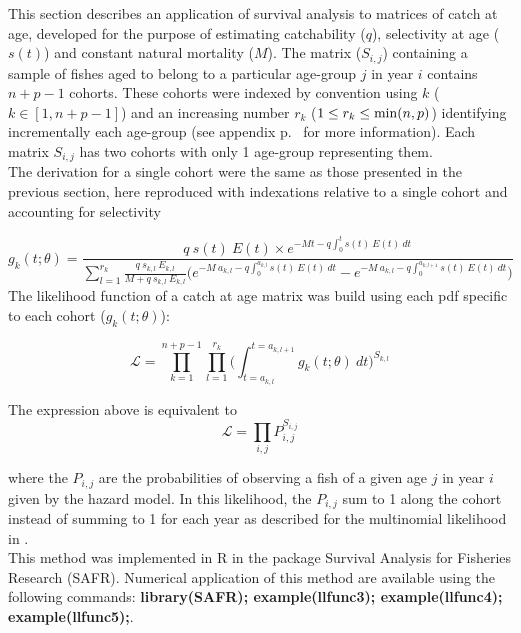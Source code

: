 This section describes an application of survival analysis to matrices of catch at age, developed for the purpose of estimating catchability ($q$), selectivity at age ($s(t)$) and constant natural mortality ($M$). The matrix ($S_{i,j}$) containing a sample of fishes aged to belong to a particular age-group $j$ in year $i$ contains $n+p-1$ cohorts. These cohorts were indexed by convention using $k$ ($k \in [1, n+p-1]$) and an increasing number $r_{k}$ ($ 1 \leq r_{k} \leq {\rm min}(n,p)$) identifying incrementally each age-group (see appendix p.~\pageref{Appendix:DefinitionsOfMathematicalSymbols} for more information). Each matrix $S_{i,j}$ has two cohorts with only 1 age-group representing them.\\

The derivation for a single cohort were the same as those presented in the previous section, here reproduced with indexations relative to a single cohort and accounting for selectivity

\begin{equation}
g_{k}(t; \theta) = \frac{q \ s(t) \ E(t) \times e^{-Mt-q\int_{0}^{t} s(t) \ E(t) \ dt}}{\sum_{l=1}^{r_{k}} \frac{q \ s_{k,l} \ E_{k,l}}{M+q \ s_{k,l} \ E_{k,l}} \bigl ( e^{-M \ a_{k,l}-q\int_{0}^{a_{k,l}}s(t) \ E(t) \ dt} - e^{-M \ a_{k,l}-q\int_{0}^{a_{k,l+1}}s(t) \ E(t) \ dt} \bigr )} 
\end{equation}
\newline
The likelihood function of a catch at age matrix was build using each pdf specific to each cohort ($g_{k}(t; \theta)$):

\begin{equation}
\mathcal{L} = \prod_{k=1}^{n+p-1} \prod_{l=1}^{r_{k}}  \bigl ( \int_{t=a_{k,l}}^{t=a_{k,l+1}} g_{k}(t; \theta) \ dt \bigr ) ^ {S_{k,l}}
\end{equation}

The expression above is equivalent to 
\begin{equation}
\mathcal{L} = \prod_{i,j} P_{i,j} ^ {S_{i,j}}
\end{equation}

\noindent where the $P_{i,j}$ are the probabilities of observing a fish of a given age $j$ in year $i$ given by the hazard model. In this likelihood, the $P_{i,j}$ sum to 1 along the cohort instead of summing to 1 for each year as described for the multinomial likelihood in \cite{Four82a}. \\

This method was implemented in R \citep{R} in the package Survival Analysis for Fisheries Research (SAFR). Numerical application of this method are available using the following commands: {\bf library(SAFR); example(llfunc3); example(llfunc4); example(llfunc5);}.\\
